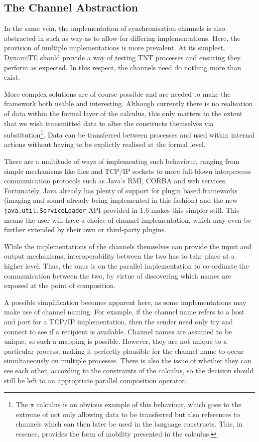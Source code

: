 \documentclass{acm_proc_article-sp}
\begin{document}
\subsection{The Channel Abstraction}
\label{channels}

In the same vein, the implementation of synchronisation channels is also
abstracted in such as way as to allow for differing implementations.
Here, the provision of multiple implementations is more prevalent.  At
its simplest, DynamiTE should provide a way of testing TNT processes and
ensuring they perform as expected.  In this respect, the channels need
do nothing more than exist.

More complex solutions are of course possible and are needed to make the
framework both usable and interesting.  Although currently there is no
realisation of data within the formal layer of the calculus, this only
matters to the extent that we wish transmitted data to alter the
constructs themselves via substitution\footnote{The $\pi$ calculus
\cite{milner:pi, picalctutorial} is an obvious example of this
behaviour, which goes to the extreme of not only allowing data to be
transferred but also references to channels which can then later be used
in the language constructs.  This, in essence, provides the form of
mobility presented in the calculus.}.  Data can be transferred between
processes and used within internal actions without having to be
explictly realised at the formal level.

There are a multitude of ways of implementing such behaviour, ranging
from simple mechanisms like files and TCP/IP sockets to more full-blown
interprocess communication protocols such as Java's RMI, CORBA and web
services.  Fortunately, Java already has plenty of support for plugin
based frameworks (imaging and sound already being implemented in this
fashion) and the new \texttt{java.util.ServiceLoader} API provided in
1.6 makes this simpler still.  This means the user will have a choice of
channel implementation, which may even be further extended by their own
or third-party plugins.

While the implementations of the channels themselves can provide the
input and output mechanisms, interoperability between the two has to
take place at a higher level.  Thus, the onus is on the parallel
implementation to co-ordinate the communication between the two, by
virtue of discovering which names are exposed at the point of
composition.  

A possible simplification becomes apparent here, as some implementations
may make use of channel naming.  For example, if the channel name refers
to a host and port for a TCP/IP implementation, then the sender need
only try and connect to see if a recipient is available.  Channel names
are assumed to be unique, so such a mapping is possible.  However, they
are not unique to a particular process, making it perfectly plausible
for the channel name to occur simultaneously on multiple processes.
There is also the issue of whether they can see each other, according to
the constraints of the calculus, so the decision should still be left to
an appropriate parallel composition operator.
\end{document}
